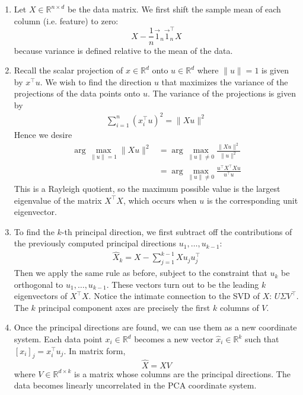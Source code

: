 \documentclass[10pt]{article}
\begin{document}
\begin{multicols}{2}
\begin{addmargin}[0.8em]{0.5em}
\begin{enumerate}[label=(\alph*)]
        \item Let $X \in \mathbb{R}^{n \times d}$ be the data matrix. We first shift the sample mean of each column (i.e. feature) to zero: 
        $$X - \frac{1}{n} \vec{1}_n \vec{1}_n^\top X$$
        because variance is defined relative to the mean of the data. 
        \item Recall the scalar projection of $x \in \mathbb{R}^d$ onto $u \in \mathbb{R}^d$ where $\|u\|=1$ is given by $x^\top u$. We wish to find the direction $u$ that maximizes the variance of the projections of the data points onto $u$. The variance of the projections is given by
        \begin{align*}
        \sum_{i=1}^n (x_i^\top u)^2 = \|Xu\|^2
        \end{align*}
        Hence we desire
        \begin{align*}
        \arg\max_{\| u \| = 1} \| Xu \|^2 &= \arg\max_{\| u \| \neq 0} \frac{\| Xu \|^2}{\| u \|^2} \\
        &= \arg\max_{\| u \| \neq 0} \frac{u^\top X^\top X u}{u^\top u}
        \end{align*}
        This is a Rayleigh quotient, so the maximum possible value is the largest eigenvalue of the matrix $X^\top X$, which occurs when $u$ is the corresponding unit eigenvector. 
        \item To find the $k$-th principal direction, we first subtract off the contributions of the previously computed principal directions $u_1, \hdots, u_{k-1}$:
        \begin{align*}
        \hat{X}_k = X - \sum_{j=1}^{k-1} Xu_j u_j^\top
        \end{align*}
        Then we apply the same rule as before, subject to the constraint that $u_k$ be orthogonal to $u_1, \hdots, u_{k-1}$. These vectors turn out to be the leading $k$ eigenvectors of $X^\top X$. Notice the intimate connection to the SVD of $X$: $U\Sigma V^\top$. The $k$ principal component axes are precisely the first $k$ columns of $V$.
        
        \item Once the principal directions are found, we can use them as a new coordinate system. Each data point $x_i \in \mathbb{R}^d$ becomes a new vector $\hat{x}_i \in \mathbb{R}^k$ such that $[x_i]_j = x_i^\top u_j$. In matrix form, $$\hat{X} = XV$$ where $V \in \mathbb{R}^{d \times k}$ is a matrix whose columns are the principal directions. The data becomes linearly uncorrelated in the PCA coordinate system.
        

\end{enumerate}
\end{addmargin}
\end{multicols}
\end{document}
